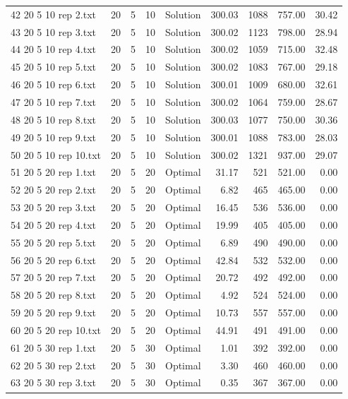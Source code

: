 \begin{longtable}{lrrllrrrr}
42 20 5 10 rep 2.txt & 20 & 5 & 10 & Solution & 300.03 & 1088 & 757.00 & 30.42\\
43 20 5 10 rep 3.txt & 20 & 5 & 10 & Solution & 300.02 & 1123 & 798.00 & 28.94\\
44 20 5 10 rep 4.txt & 20 & 5 & 10 & Solution & 300.02 & 1059 & 715.00 & 32.48\\
45 20 5 10 rep 5.txt & 20 & 5 & 10 & Solution & 300.02 & 1083 & 767.00 & 29.18\\
46 20 5 10 rep 6.txt & 20 & 5 & 10 & Solution & 300.01 & 1009 & 680.00 & 32.61\\
47 20 5 10 rep 7.txt & 20 & 5 & 10 & Solution & 300.02 & 1064 & 759.00 & 28.67\\
48 20 5 10 rep 8.txt & 20 & 5 & 10 & Solution & 300.03 & 1077 & 750.00 & 30.36\\
49 20 5 10 rep 9.txt & 20 & 5 & 10 & Solution & 300.01 & 1088 & 783.00 & 28.03\\
50 20 5 10 rep 10.txt & 20 & 5 & 10 & Solution & 300.02 & 1321 & 937.00 & 29.07\\
51 20 5 20 rep 1.txt & 20 & 5 & 20 & Optimal & 31.17 & 521 & 521.00 &  0.00\\
52 20 5 20 rep 2.txt & 20 & 5 & 20 & Optimal &  6.82 & 465 & 465.00 &  0.00\\
53 20 5 20 rep 3.txt & 20 & 5 & 20 & Optimal & 16.45 & 536 & 536.00 &  0.00\\
54 20 5 20 rep 4.txt & 20 & 5 & 20 & Optimal & 19.99 & 405 & 405.00 &  0.00\\
55 20 5 20 rep 5.txt & 20 & 5 & 20 & Optimal &  6.89 & 490 & 490.00 &  0.00\\
56 20 5 20 rep 6.txt & 20 & 5 & 20 & Optimal & 42.84 & 532 & 532.00 &  0.00\\
57 20 5 20 rep 7.txt & 20 & 5 & 20 & Optimal & 20.72 & 492 & 492.00 &  0.00\\
58 20 5 20 rep 8.txt & 20 & 5 & 20 & Optimal &  4.92 & 524 & 524.00 &  0.00\\
59 20 5 20 rep 9.txt & 20 & 5 & 20 & Optimal & 10.73 & 557 & 557.00 &  0.00\\
60 20 5 20 rep 10.txt & 20 & 5 & 20 & Optimal & 44.91 & 491 & 491.00 &  0.00\\
61 20 5 30 rep 1.txt & 20 & 5 & 30 & Optimal &  1.01 & 392 & 392.00 &  0.00\\
62 20 5 30 rep 2.txt & 20 & 5 & 30 & Optimal &  3.30 & 460 & 460.00 &  0.00\\
63 20 5 30 rep 3.txt & 20 & 5 & 30 & Optimal &  0.35 & 367 & 367.00 &  0.00\\

\end{longtable}
